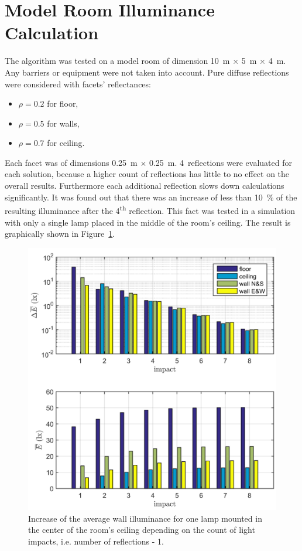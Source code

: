 \section{Model Room Illuminance Calculation}
The algorithm was tested on a model room of dimension 10~m $\times$ 5~m $\times$ 4~m. Any barriers or equipment were not taken into account. Pure diffuse reflections were considered with facets' reflectances:

\begin{itemize}
	\item $\rho = 0.2$ for floor,
	\item $\rho = 0.5$ for walls,
	\item $\rho = 0.7$ for ceiling.
\end{itemize}

Each facet was of dimensions 0.25~m $\times$ 0.25~m. 4~reflections were evaluated for each solution, because a higher count of reflections has little to no effect on the overall results. Furthermore each additional reflection slows down calculations significantly. It was found out that there was an increase of less than 10~\% of the resulting illuminance after the 4\textsuperscript{th} reflection. This fact was tested in a simulation with only a single lamp placed in the middle of the room's ceiling. The result is graphically shown in Figure~\ref{fig:reflDif}.

\begin{figure}[htb]
  \centering
  \includegraphics[width=\columnwidth]{reflDif}
  \caption{Increase of the average wall illuminance for one lamp mounted in the center of the room's ceiling depending on the count of light impacts, i.e. number of reflections - 1.}
  \label{fig:reflDif}
\end{figure}

